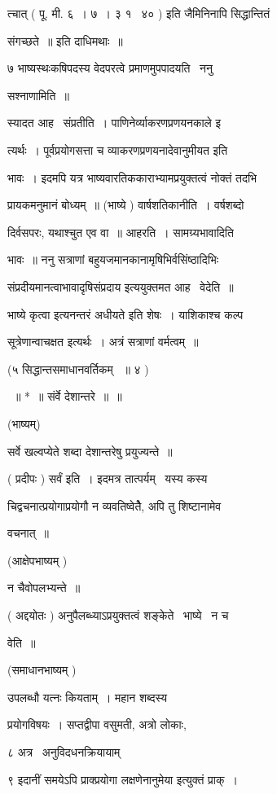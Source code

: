 \documentclass[11pt, openany]{book}
\begin{document}
त्चात् ( पू. मी. ६~। ७~। ३ १ \textendash\ ४० ) इति जैमिनिनापि सिद्धान्तितं 

संगच्छते~॥ इति दाधिमथाः~॥ 

७ {\qt भाष्यस्थःकषि}पदस्य वेदपरत्वे प्रमाणमुपपादयति \textendash\ ननु 

सश्नाणामिति~॥ 





स्यादत आह \textendash\ संप्रतीति~। पाणिनेर्व्याकरणप्रणयनकाले इ \textendash\ 

त्यर्थः~। पूर्वप्रयोगसत्ता च व्याकरणप्रणयनादेवानुमीयत इति 

भावः~। इदमपि यत्र भाष्यवारतिककाराभ्यामप्रयुक्तत्वं नोक्तं तदभि \textendash\ 

प्रायकमनुमानं बोध्यम्~॥ (भाष्ये ) वार्षशतिकानीति~। वर्षशब्दो 

दिर्वसपरः, यथाश्चुत एव वा~॥ आहरति~। सामग्र्यभावादिति 

भावः~॥ ननु सत्राणां बहुयजमानकानामृषिभिर्वसिंष्ठादिभिः 

संप्रदीयमानत्वाभावादृषिसंप्रदाय इत्ययुक्तमत आह \textendash\ वेदेति~॥ 

भाष्ये {\qt कृत्वा} इत्यनन्तरं अधीयते इति शेषः~। याशिकाश्च कल्प \textendash\ 

सूत्रेणान्वाचक्षत इत्यर्थः~। अत्रं सत्राणां वर्मत्वम्~॥ 

(५ सिद्धान्तसमाधानवर्तिकम् ~॥ ४ ) 

~॥ *~॥ संर्वे देशान्तरे~॥~॥ 

(भाष्यम्) 

सर्वे खल्वप्येते शब्दा देशान्तरेषु प्रयुज्यन्ते~॥ 

( प्रदीपः ) सर्वं इति~। इदमत्र तात्पर्यम् \textendash\ यस्य कस्य \textendash\ 

चिद्वचनात्प्रयोगाप्रयोगौ न व्यवतिष्वेतैे, अपि तु शिष्टानामेव 

वचनात्~॥ 

(आक्षेपभाष्यम् ) 

न चैवोपलभ्यन्ते~॥ 

( अद्दयोतः ) अनुपैलब्ध्याऽप्रयुक्तत्वं शङ्केते \textendash\ भाष्ये \textendash\ न च \textendash\ 

वेति~॥ 

(समाधानभाष्यम् ) 

उपलब्धौ यत्नः कियताम्~। महान शब्दस्य 

प्रयोगविषयः~। सप्तद्वीपा वसुमती, अत्रो लोकाः, 

८ अत्र \textendash\ अनुविदधनक्रियायाम् 

९ इदानीं समयेऽपि प्राक्प्रयोगा लक्षणेनानुमेया इत्युक्तं प्राक्~। 
\end{document}
